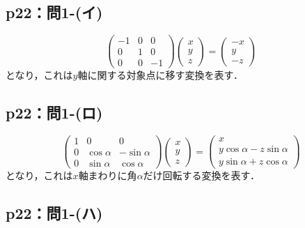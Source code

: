 \subsection*{p22：問1-(イ)}
\begin{tanswer}
  \[
    \begin{pmatrix}
      -1 & 0 & 0  \\
      0  & 1 & 0  \\
      0  & 0 & -1
    \end{pmatrix}
    \begin{pmatrix}
      x \\
      y \\
      z
    \end{pmatrix}
    =\begin{pmatrix}
      -x \\
      y  \\
      -z
    \end{pmatrix}
  \]
  となり，これは$y$軸に関する対象点に移す変換を表す．
\end{tanswer}

\subsection*{p22：問1-(ロ)}
\begin{tanswer}
  \[
    \begin{pmatrix}
      1 & 0           & 0            \\
      0 & \cos \alpha & -\sin \alpha \\
      0 & \sin \alpha & \cos \alpha
    \end{pmatrix}
    \begin{pmatrix}
      x \\
      y \\
      z
    \end{pmatrix}
    =
    \begin{pmatrix}
      x                            \\
      y \cos \alpha -z \sin \alpha \\
      y \sin \alpha + z \cos \alpha
    \end{pmatrix}
  \]
  となり，これは$x$軸まわりに角$\alpha$だけ回転する変換を表す．
\end{tanswer}

\subsection*{p22：問1-(ハ)}

